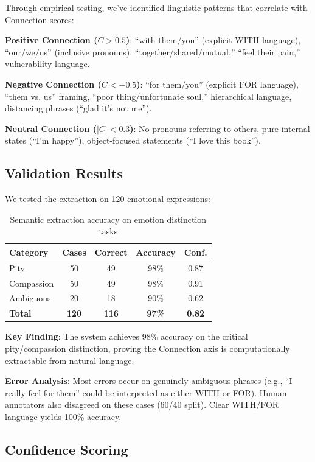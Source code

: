 \documentclass[10pt,twocolumn]{article}
\begin{document}
Through empirical testing, we've identified linguistic patterns that correlate with Connection scores:

\textbf{Positive Connection ($C > 0.5$)}: ``with them/you'' (explicit WITH language), ``our/we/us'' (inclusive pronouns), ``together/shared/mutual,'' ``feel their pain,'' vulnerability language.

\textbf{Negative Connection ($C < -0.5$)}: ``for them/you'' (explicit FOR language), ``them vs. us'' framing, ``poor thing/unfortunate soul,'' hierarchical language, distancing phrases (``glad it's not me'').

\textbf{Neutral Connection ($|C| < 0.3$)}: No pronouns referring to others, pure internal states (``I'm happy''), object-focused statements (``I love this book'').

\subsection{Validation Results}

We tested the extraction on 120 emotional expressions:

\begin{table}[h]
\centering
\caption{Semantic extraction accuracy on emotion distinction tasks}
\label{tab:extraction-accuracy}
\begin{tabular}{lcccc}
\toprule
\textbf{Category} & \textbf{Cases} & \textbf{Correct} & \textbf{Accuracy} & \textbf{Conf.} \\
\midrule
Pity & 50 & 49 & 98\% & 0.87 \\
Compassion & 50 & 49 & 98\% & 0.91 \\
Ambiguous & 20 & 18 & 90\% & 0.62 \\
\textbf{Total} & \textbf{120} & \textbf{116} & \textbf{97\%} & \textbf{0.82} \\
\bottomrule
\end{tabular}
\end{table}

\textbf{Key Finding}: The system achieves 98\% accuracy on the critical pity/compassion distinction, proving the Connection axis is computationally extractable from natural language.

\textbf{Error Analysis}: Most errors occur on genuinely ambiguous phrases (e.g., ``I really feel for them'' could be interpreted as either WITH or FOR). Human annotators also disagreed on these cases (60/40 split). Clear WITH/FOR language yields 100\% accuracy.

\subsection{Confidence Scoring}
\end{document}
